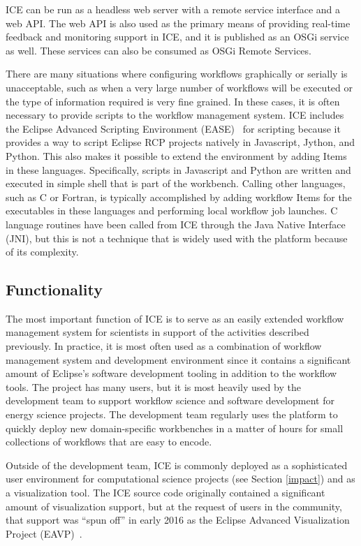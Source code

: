 ICE can be run as a headless web server with a remote service interface and a web
API. The web API is also used as the primary means of providing real-time 
feedback and monitoring support in ICE, and it is published as an OSGi service
as well. These services can also be consumed as OSGi Remote Services.

There are many situations where configuring workflows graphically or serially is
unacceptable, such as when a very large number of workflows will be
executed or the type of information required is very fine grained. In
these cases, it is often necessary to provide scripts to the workflow
management system. ICE includes the Eclipse Advanced Scripting
Environment (EASE)~\cite{pontesegger_eclipse_2015} for scripting because it
provides a way to script Eclipse RCP projects natively in Javascript,
Jython, and Python. This also makes it possible to extend the
environment by adding Items in these languages. Specifically, scripts in
Javascript and Python are written and executed in simple shell that is part of
the workbench. Calling other languages, such as C or Fortran, is typically
accomplished by adding workflow Items for the executables in these languages
and performing local workflow job launches. C language routines have been
called from ICE through the Java Native Interface (JNI), but this is not a
technique that is widely used with the platform because of its complexity.

\subsection{Functionality}\label{software-functionalities}

The most important function of ICE is to serve as an easily extended
workflow management system for scientists in support of
the activities described previously. In practice, it is most often used as a
combination of workflow management system and development environment
since it contains a significant amount of Eclipse's software development
tooling in addition to the workflow tools. The project has many users,
but it is most heavily used by the development team to support workflow
science and software development for energy science projects. The
development team regularly uses the platform to quickly deploy new
domain-specific workbenches in a matter of hours for small collections
of workflows that are easy to encode.

Outside of the development team, ICE is commonly deployed as a sophisticated
user environment for computational science projects (see Section \ref{impact})
and as a visualization tool. The ICE source code originally contained a
significant amount of visualization support, but at the request of users in the
community, that support was ``spun off'' in early 2016 as the Eclipse Advanced
Visualization Project (EAVP)~\cite{billings_eclipse_2015}.

